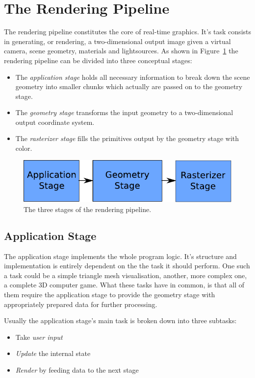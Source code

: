 \section{The Rendering Pipeline}
The rendering pipeline constitutes the core of real-time graphics. It's task
consists in generating, or rendering, a two-dimensional output image given a
virtual camera, scene geometry, materials and
lightsources\cite{book:akenine-rtr}. As shown in Figure~\ref{fig:RAGR} the
rendering pipeline can be divided into three conceptual stages:
\begin{itemize}
 \item The \textit{application stage} holds all necessary information to break
down the scene geometry into smaller chunks which actually are passed on to the
geometry stage.
 \item The \textit{geometry stage} transforms the input geometry to a
two-dimensional output coordinate system.
 \item The \textit{rasterizer stage} fills the primitives output by the
geometry stage with color.
\end{itemize}

\begin{figure}
\begin{center}
\includegraphics[scale=0.8]{Images/Rendering-Pipeline-AGR.pdf}
\caption{The three stages of the rendering pipeline.}
\label{fig:RAGR}
\end{center}
\end{figure}

\subsection{Application Stage}
The application stage implements the whole program logic. It's structure and
implementation is entirely dependent on the the task it should perform. One
such a task could be a simple triangle mesh visualisation, another, more
complex one, a complete 3D computer game. What these tasks have in common, is
that all of them require the application stage to provide the geometry stage
with appropriately prepared data for further processing.

Usually the application stage's main task is broken down into three subtasks:
\begin{itemize}
 \item Take \textit{user input}
 \item \textit{Update} the internal state
 \item \textit{Render} by feeding data to the next stage
\end{itemize}

